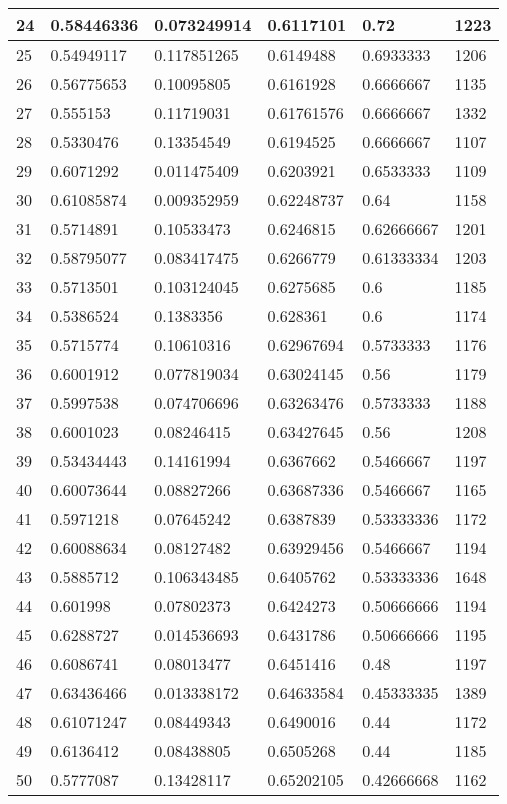 \begin{longtable}{|l|l|l|l|l|l|}
24 & 0.58446336 & 0.073249914 & 0.6117101 & 0.72 & 1223 \\ \hline 
25 & 0.54949117 & 0.117851265 & 0.6149488 & 0.6933333 & 1206 \\ \hline 
26 & 0.56775653 & 0.10095805 & 0.6161928 & 0.6666667 & 1135 \\ \hline 
27 & 0.555153 & 0.11719031 & 0.61761576 & 0.6666667 & 1332 \\ \hline 
28 & 0.5330476 & 0.13354549 & 0.6194525 & 0.6666667 & 1107 \\ \hline 
29 & 0.6071292 & 0.011475409 & 0.6203921 & 0.6533333 & 1109 \\ \hline 
30 & 0.61085874 & 0.009352959 & 0.62248737 & 0.64 & 1158 \\ \hline 
31 & 0.5714891 & 0.10533473 & 0.6246815 & 0.62666667 & 1201 \\ \hline 
32 & 0.58795077 & 0.083417475 & 0.6266779 & 0.61333334 & 1203 \\ \hline 
33 & 0.5713501 & 0.103124045 & 0.6275685 & 0.6 & 1185 \\ \hline 
34 & 0.5386524 & 0.1383356 & 0.628361 & 0.6 & 1174 \\ \hline 
35 & 0.5715774 & 0.10610316 & 0.62967694 & 0.5733333 & 1176 \\ \hline 
36 & 0.6001912 & 0.077819034 & 0.63024145 & 0.56 & 1179 \\ \hline 
37 & 0.5997538 & 0.074706696 & 0.63263476 & 0.5733333 & 1188 \\ \hline 
38 & 0.6001023 & 0.08246415 & 0.63427645 & 0.56 & 1208 \\ \hline 
39 & 0.53434443 & 0.14161994 & 0.6367662 & 0.5466667 & 1197 \\ \hline 
40 & 0.60073644 & 0.08827266 & 0.63687336 & 0.5466667 & 1165 \\ \hline 
41 & 0.5971218 & 0.07645242 & 0.6387839 & 0.53333336 & 1172 \\ \hline 
42 & 0.60088634 & 0.08127482 & 0.63929456 & 0.5466667 & 1194 \\ \hline 
43 & 0.5885712 & 0.106343485 & 0.6405762 & 0.53333336 & 1648 \\ \hline 
44 & 0.601998 & 0.07802373 & 0.6424273 & 0.50666666 & 1194 \\ \hline 
45 & 0.6288727 & 0.014536693 & 0.6431786 & 0.50666666 & 1195 \\ \hline 
46 & 0.6086741 & 0.08013477 & 0.6451416 & 0.48 & 1197 \\ \hline 
47 & 0.63436466 & 0.013338172 & 0.64633584 & 0.45333335 & 1389 \\ \hline 
48 & 0.61071247 & 0.08449343 & 0.6490016 & 0.44 & 1172 \\ \hline 
49 & 0.6136412 & 0.08438805 & 0.6505268 & 0.44 & 1185 \\ \hline 
50 & 0.5777087 & 0.13428117 & 0.65202105 & 0.42666668 & 1162 \\ \hline 
\end{longtable}